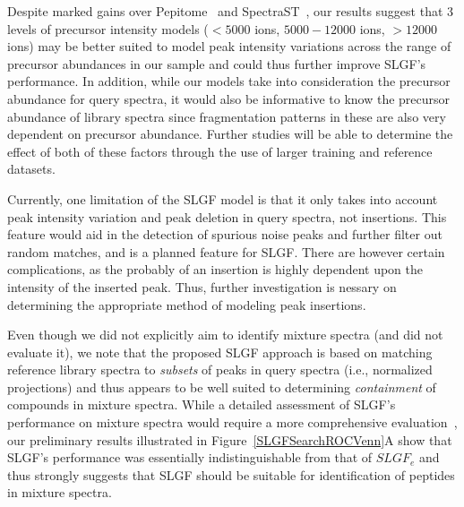 \documentclass[endnotes,11pt]{article}
\begin{document}
%


Despite marked gains over Pepitome~\cite{dasari12} and SpectraST~\cite{lam07}, our results suggest that 3 levels of precursor intensity models ($<5000$ ions, $5000-12000$ ions, $>12000$ ions) may be better suited to model peak intensity variations across the range of precursor abundances in our sample and could thus further improve SLGF's performance. In addition, while our models take into consideration the precursor abundance for query spectra, it would also be informative to know the precursor abundance of library spectra since fragmentation patterns in these are also very dependent on precursor abundance. Further studies will be able to determine the effect of both of these factors through the use of larger training and reference datasets.

Currently, one limitation of the SLGF model is that it only takes into account peak intensity variation and peak deletion in query spectra, not insertions. This feature would aid in the detection of spurious noise peaks and further filter out random matches, and is a planned feature for SLGF. There are however certain complications, as the probably of an insertion is highly dependent upon the intensity of the inserted peak. Thus, further investigation is nessary on determining the appropriate method of modeling peak insertions. 

Even though we did not explicitly aim to identify mixture spectra (and did not evaluate it), we note that the proposed SLGF approach is based on matching reference library spectra to {\em subsets} of peaks in query spectra (i.e., normalized projections) and thus appears to be well suited to determining \emph{containment} of compounds in mixture spectra. While a detailed assessment of SLGF's performance on mixture spectra would require a more comprehensive evaluation~\cite{wang10}, our preliminary results illustrated in Figure~\ref{SLGFSearchROCVenn}A show that SLGF's performance was essentially indistinguishable from that of $SLGF_e$ and thus strongly suggests that SLGF should be suitable for identification of peptides in mixture spectra.
\end{document}
